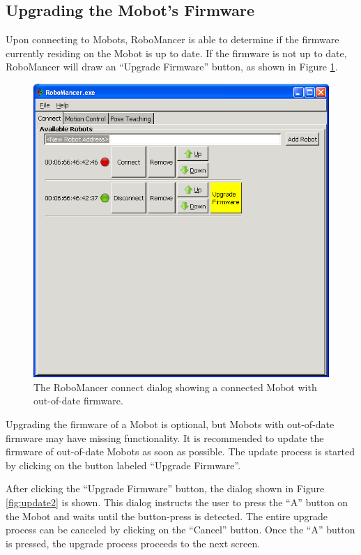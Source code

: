 \documentclass{article}
\begin{document}
\subsection{Upgrading the Mobot's Firmware}
Upon connecting to Mobots, RoboMancer is able to determine if the firmware 
currently residing on the Mobot is up to date. If the firmware is not up to 
date, RoboMancer will draw an ``Upgrade Firmware'' button, as shown in 
Figure \ref{fig:update1}. 

\begin{figure}[H]
\begin{center}
\includegraphics[width=4.5in]{images/update1.png}
\end{center}
\caption{\label{fig:update1} The RoboMancer connect dialog showing a connected
Mobot with out-of-date firmware.}
\end{figure}

Upgrading the firmware of a Mobot is optional, but Mobots with out-of-date firmware
may have missing functionality. It is recommended to update the firmware of
out-of-date Mobots as soon as possible. The update process is started by
clicking on the button labeled ``Upgrade Firmware''. 

After clicking the ``Upgrade Firmware'' button, the dialog shown in Figure
\ref{fig:update2} is shown. This dialog instructs the user to press the ``A''
button on the Mobot and waits until the button-press is detected. The 
entire upgrade process can be canceled by clicking on the ``Cancel'' button.
Once the ``A'' button is pressed, the upgrade process proceeds to the next screen.
\end{document}
